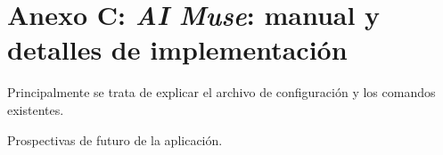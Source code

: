 \chapter*{Anexo C: \textit{AI Muse}: manual y detalles de implementación}
\label{anexo:aimuse}


Principalmente se trata de explicar el archivo de configuración y los comandos existentes.

Prospectivas de futuro de la aplicación.
